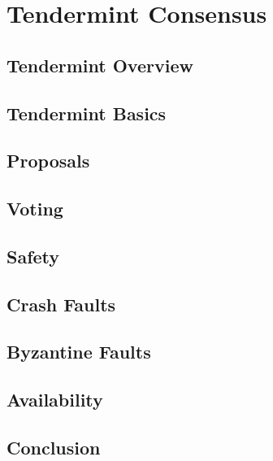 \chapter{Tendermint Consensus}

\section{Tendermint Overview}

\section{Tendermint Basics}

\section{Proposals}

\section{Voting}

\section{Safety}

\section{Crash Faults}

\section{Byzantine Faults}

\section{Availability}

\section{Conclusion}
